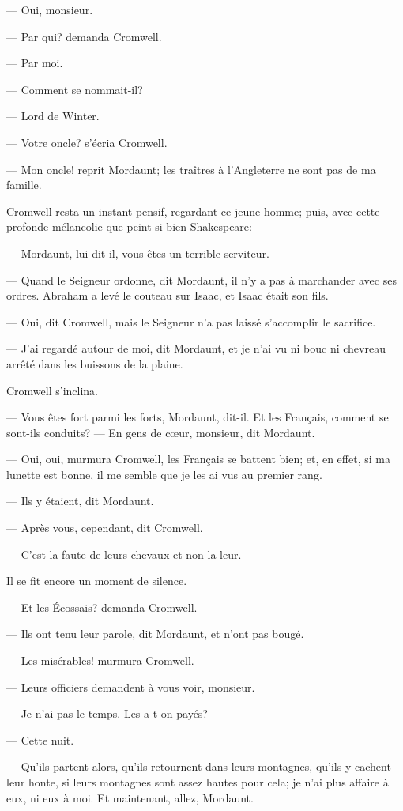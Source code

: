 — Oui, monsieur.

— Par qui? demanda Cromwell.

— Par moi.

— Comment se nommait-il?

— Lord de Winter.

— Votre oncle? s'écria Cromwell.

— Mon oncle! reprit Mordaunt; les traîtres à l'Angleterre ne sont pas de ma famille.

Cromwell resta un instant pensif, regardant ce jeune homme; puis, avec cette profonde mélancolie que peint si bien Shakespeare:

— Mordaunt, lui dit-il, vous êtes un terrible serviteur.

— Quand le Seigneur ordonne, dit Mordaunt, il n'y a pas à marchander avec ses ordres. Abraham a levé le couteau sur Isaac, et Isaac était son fils.

— Oui, dit Cromwell, mais le Seigneur n'a pas laissé s'accomplir le sacrifice.

— J'ai regardé autour de moi, dit Mordaunt, et je n'ai vu ni bouc ni chevreau arrêté dans les buissons de la plaine.

Cromwell s'inclina.

— Vous êtes fort parmi les forts, Mordaunt, dit-il. Et les Français, comment se sont-ils conduits?
— En gens de cœur, monsieur, dit Mordaunt.

— Oui, oui, murmura Cromwell, les Français se battent bien; et, en effet, si ma lunette est bonne, il me semble que je les ai vus au premier rang.

— Ils y étaient, dit Mordaunt.

— Après vous, cependant, dit Cromwell.

— C'est la faute de leurs chevaux et non la leur.

Il se fit encore un moment de silence.

— Et les Écossais? demanda Cromwell.

— Ils ont tenu leur parole, dit Mordaunt, et n'ont pas bougé.

— Les misérables! murmura Cromwell.

— Leurs officiers demandent à vous voir, monsieur.

— Je n'ai pas le temps. Les a-t-on payés?

— Cette nuit.

— Qu'ils partent alors, qu'ils retournent dans leurs montagnes, qu'ils y cachent leur honte, si leurs montagnes sont assez hautes pour cela; je n'ai plus affaire à eux, ni eux à moi. Et maintenant, allez, Mordaunt.

